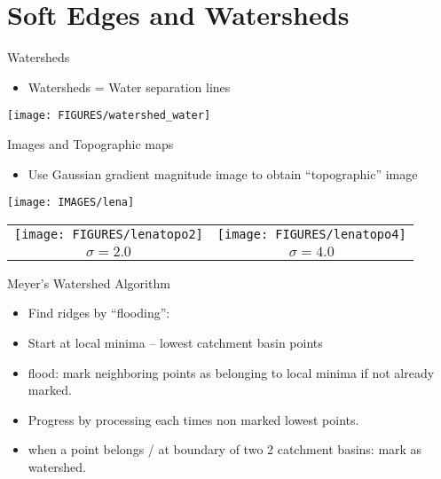 \documentclass[9pt]{beamer}
\begin{document}
\section{Soft Edges and Watersheds}
\label{sec:water}


\begin{frame}{Watersheds}
  \begin{itemize}
  \item Watersheds = Water separation lines
  \end{itemize}
  \begin{center}
    \texttt{[image: FIGURES/watershed\_water]}
  \end{center}
\end{frame}


\begin{frame}{Images and Topographic maps}
  \begin{itemize}
  \item Use Gaussian gradient magnitude image to obtain ``topographic'' image
  \end{itemize}
  \begin{center}
    \texttt{[image: IMAGES/lena]}
  \end{center}
\begin{center}
  \begin{tabular}{cc}
    \texttt{[image: FIGURES/lenatopo2]}&
  \texttt{[image: FIGURES/lenatopo4]}\\
$\sigma=2.0$&$\sigma=4.0$
  \end{tabular}
\end{center}
\end{frame}


\begin{frame}{Meyer's Watershed Algorithm}
  \begin{itemize}
  \item Find ridges by ``flooding'':
  \item Start at local minima -- lowest catchment basin points
  \item flood: mark neighboring points as belonging to local minima if not already marked.
  \item Progress by processing each times non marked lowest points.
  \item when a point belongs / at boundary of two 2 catchment basins: mark as watershed.
  \end{itemize}
\end{frame}
\end{document}
